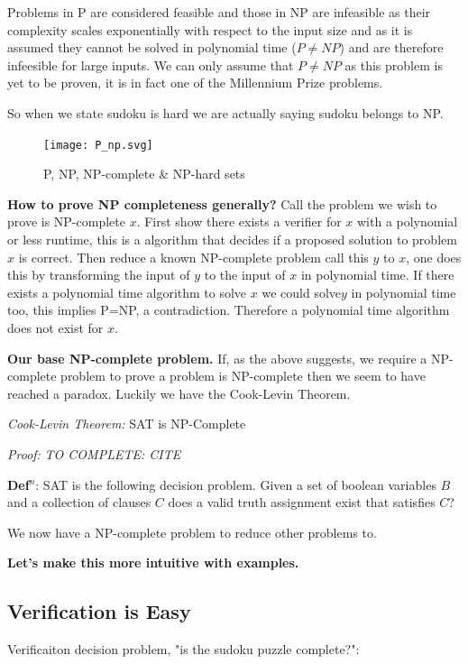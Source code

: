 \documentclass[a4paper,12pt]{article}
\begin{document}
Problems in P are considered feasible and those in NP are infeasible as their complexity scales exponentially with respect to the input size and as it is assumed they cannot be solved in polynomial time ($P \neq NP$) and are therefore infeesible for large inputs. We can only assume that $P\neq NP$ as this problem is yet to be proven, it is in fact one of the Millennium Prize problems.

So when we state sudoku is hard we are actually saying sudoku belongs to NP.

\begin{figure}[h!]
	\begin{center}
		\texttt{[image: P\_np.svg]}
	\end{center}
	\caption{P, NP, NP-complete \& NP-hard sets \cite{P_NP_Figure}}
\end{figure}

\textbf{How to prove NP completeness generally?}
Call the problem we wish to prove is NP-complete $x$. First show there exists a verifier for $x$ with a polynomial or less runtime, this is a algorithm that decides if a proposed solution to problem $x$  is correct. Then reduce a known NP-complete problem call this $y$ to $x$, one does this by transforming the input of $y$ to the input of $x$ in polynomial time. If there exists a polynomial time algorithm to solve $x$ we could solve$y$ in polynomial time too, this implies P=NP, a contradiction. Therefore a polynomial time algorithm does not exist for $x$.

\textbf{Our base NP-complete problem.} If, as the above suggests, we require a NP-complete problem to prove a problem is NP-complete then we seem to have reached a paradox. Luckily we have the Cook-Levin Theorem.

\textit{Cook-Levin Theorem:} SAT is NP-Complete
	
\textit{Proof:}	 \textit{TO COMPLETE: CITE }

\textbf{Def$^n$}: SAT is the following decision problem. Given a set of boolean variables $B$ and a collection of clauses $C$ does a valid truth assignment exist that satisfies $C$?

We now have a NP-complete problem to reduce other problems to.

\textbf{Let's make this more intuitive with examples.} 

\subsection{Verification is Easy}
Verificaiton decision problem, "is the sudoku puzzle complete?":
\end{document}
